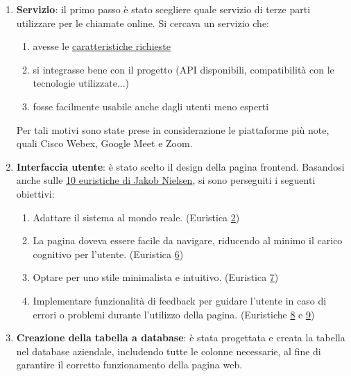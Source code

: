 \begin{enumerate}
   \label{sec:scelta_del_servizo}
   \item \textbf{Servizio}: il primo passo è stato scegliere quale servizio di terze parti utilizzare per le chiamate online. 
   Si cercava un servizio che: 
   
      \begin{enumerate}
         \item avesse le \hyperref[sec:caratteristiche_meeting]{caratteristiche richieste}
         \item si integrasse bene con il progetto (API disponibili, compatibilità con le tecnologie utilizzate...)
         \item fosse facilmente usabile anche dagli utenti meno esperti
      \end{enumerate}
   
   Per tali motivi sono state prese in considerazione le piattaforme più note, quali Cisco Webex, Google Meet e Zoom.
   
   \item \textbf{Interfaccia utente}: è stato scelto il design della pagina frontend. 
   Basandosi anche sulle \hyperref[sec:euristiche_nielsen]{10 euristiche di Jakob Nielsen}, si sono perseguiti i seguenti obiettivi:

   \begin{enumerate}
      \item Adattare il sistema al mondo reale. (Euristica \hyperref[sec:euristiche_nielsen2]{2})
      \item La pagina doveva essere facile da navigare, riducendo al minimo il carico cognitivo per l'utente. 
      (Euristica \hyperref[sec:euristiche_nielsen6]{6})
      \item  Optare per uno stile minimalista e intuitivo. (Euristica \hyperref[sec:euristiche_nielsen7]{7})
      \item Implementare funzionalità di feedback per guidare l'utente in caso di errori o problemi durante l'utilizzo della pagina.
      (Euristiche \hyperref[sec:euristiche_nielsen8]{8} e \hyperref[sec:euristiche_nielsen9]{9})
   \end{enumerate}

   \item \textbf{Creazione della tabella a database}: è stata progettata e creata la tabella nel database aziendale,
   includendo tutte le colonne necessarie,  al fine di garantire il corretto funzionamento della pagina web.


\end{enumerate}
